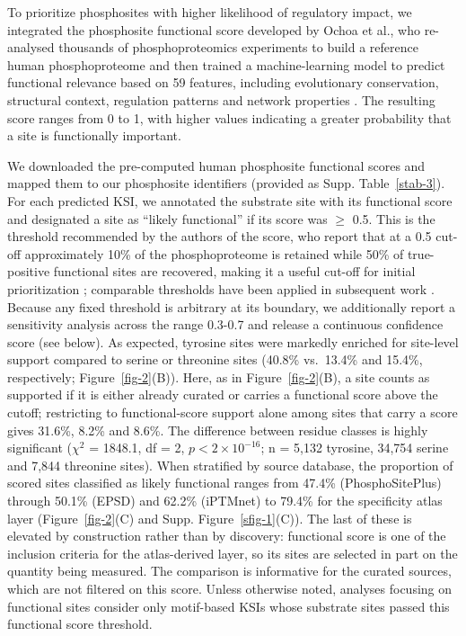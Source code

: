 \documentclass[
  number,
  preprint,
  onecolumn]{elsarticle}
\begin{document}
To prioritize phosphosites with higher likelihood of regulatory impact,
we integrated the phosphosite functional score developed by Ochoa et
al., who re-analysed thousands of phosphoproteomics experiments to build
a reference human phosphoproteome and then trained a machine-learning
model to predict functional relevance based on 59 features, including
evolutionary conservation, structural context, regulation patterns and
network properties \citep{Ochoa2020-og}. The resulting score ranges from
0 to 1, with higher values indicating a greater probability that a site
is functionally important.

We downloaded the pre-computed human phosphosite functional scores and
mapped them to our phosphosite identifiers (provided as
Supp. Table~\ref{stab-3}). For each predicted KSI, we annotated the
substrate site with its functional score and designated a site as
``likely functional'' if its score was \(\ge\) 0.5. This is the
threshold recommended by the authors of the score, who report that at a
0.5 cut-off approximately 10\% of the phosphoproteome is retained while
50\% of true-positive functional sites are recovered, making it a useful
cut-off for initial prioritization \citep{Ochoa2020-og}; comparable
thresholds have been applied in subsequent work
\citep{Yaron-Barir2024-lv}. Because any fixed threshold is arbitrary at
its boundary, we additionally report a sensitivity analysis across the
range 0.3-0.7 and release a continuous confidence score (see below). As
expected, tyrosine sites were markedly enriched for site-level support
compared to serine or threonine sites (40.8\% vs.~13.4\% and 15.4\%,
respectively; Figure~\ref{fig-2}(B)). Here, as in Figure~\ref{fig-2}(B),
a site counts as supported if it is either already curated or carries a
functional score above the cutoff; restricting to functional-score
support alone among sites that carry a score gives 31.6\%, 8.2\% and
8.6\%. The difference between residue classes is highly significant
(\(\chi^2\) = 1848.1, df = 2, \(p < 2 \times 10^{-16}\); n = 5,132
tyrosine, 34,754 serine and 7,844 threonine sites). When stratified by
source database, the proportion of scored sites classified as likely
functional ranges from 47.4\% (PhosphoSitePlus) through 50.1\% (EPSD)
and 62.2\% (iPTMnet) to 79.4\% for the specificity atlas layer
(Figure~\ref{fig-2}(C) and Supp. Figure~\ref{sfig-1}(C)). The last of
these is elevated by construction rather than by discovery: functional
score is one of the inclusion criteria for the atlas-derived layer, so
its sites are selected in part on the quantity being measured. The
comparison is informative for the curated sources, which are not
filtered on this score. Unless otherwise noted, analyses focusing on
functional sites consider only motif-based KSIs whose substrate sites
passed this functional score threshold.
\end{document}
